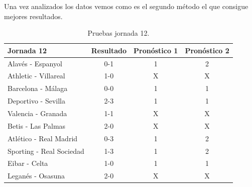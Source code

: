 Una vez analizados los datos vemos como es el segundo método el que consigue mejores resultados.
 \begin{table}
  \begin{center}
    \centering
    \begin{tabular}{p{5cm} c c c }
    \toprule
   	Jornada 12 & Resultado & Pronóstico 1 & Pronóstico 2\\
    \midrule
    Alavés - Espanyol & 0-1 & \cellcolor{red!30}1 & \cellcolor{green!30}2\\    
    Athletic - Villareal & 1-0 & \cellcolor{red!30}X & \cellcolor{red!30}X\\    
    Barcelona - Málaga & 0-0 & \cellcolor{red!30}1 & \cellcolor{red!30}1\\    
    Deportivo - Sevilla & 2-3 & \cellcolor{red!30}1 & \cellcolor{red!30}1\\    
    Valencia - Granada & 1-1 & \cellcolor{green!30}X & \cellcolor{green!30}X\\    
    Betis - Las Palmas & 2-0 & \cellcolor{red!30}X & \cellcolor{red!30}X\\
    Atlético - Real Madrid & 0-3 & \cellcolor{red!30}1 & \cellcolor{green!30}2\\
    Sporting - Real Sociedad & 1-3 & \cellcolor{red!30}1 & \cellcolor{green!30}2\\    
	Eibar - Celta & 1-0 & \cellcolor{green!30}1 & \cellcolor{green!30}1\\
    Leganés - Osasuna & 2-0 & \cellcolor{red!30}X & \cellcolor{red!30}X\\
    \bottomrule
   \end{tabular}
   \caption{Pruebas jornada 12.}
   \label{tabla:jornada12}
  \end{center}
 \end{table} 

